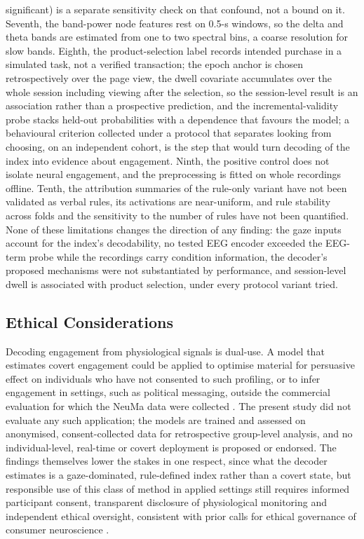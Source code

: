 \documentclass[pdflatex,sn-basic,Numbered,twocolumn,iicol]{sn-jnl}
\theoremstyle{thmstyleone}%
\theoremstyle{thmstyletwo}%
\theoremstyle{thmstylethree}%
\begin{document}
significant) is a separate sensitivity check on that confound, not a bound on it. Seventh, the band-power node features rest on 0.5-s windows, so the delta and theta bands are estimated from one to two spectral bins, a coarse resolution for slow bands. Eighth, the product-selection label records intended purchase in a simulated task, not a verified transaction; the epoch anchor is chosen retrospectively over the page view, the dwell covariate accumulates over the whole session including viewing after the selection, so the session-level result is an association rather than a prospective prediction, and the incremental-validity probe stacks held-out probabilities with a dependence that favours the model; a behavioural criterion collected under a protocol that separates looking from choosing, on an independent cohort, is the step that would turn decoding of the index into evidence about engagement. Ninth, the positive control does not isolate neural engagement, and the preprocessing is fitted on whole recordings offline. Tenth, the attribution summaries of the rule-only variant have not been validated as verbal rules, its activations are near-uniform, and rule stability across folds and the sensitivity to the number of rules have not been quantified. None of these limitations changes the direction of any finding: the gaze inputs account for the index's decodability, no tested EEG encoder exceeded the EEG-term probe while the recordings carry condition information, the decoder's proposed mechanisms were not substantiated by performance, and session-level dwell is associated with product selection, under every protocol variant tried.

\subsection{Ethical Considerations}\label{disc:ethics}

Decoding engagement from physiological signals is dual-use. A model that estimates covert engagement could be applied to optimise material for persuasive effect on individuals who have not consented to such profiling, or to infer engagement in settings, such as political messaging, outside the commercial evaluation for which the NeuMa data were collected \cite{ref35}. The present study did not evaluate any such application; the models are trained and assessed on anonymised, consent-collected data for retrospective group-level analysis, and no individual-level, real-time or covert deployment is proposed or endorsed. The findings themselves lower the stakes in one respect, since what the decoder estimates is a gaze-dominated, rule-defined index rather than a covert state, but responsible use of this class of method in applied settings still requires informed participant consent, transparent disclosure of physiological monitoring and independent ethical oversight, consistent with prior calls for ethical governance of consumer neuroscience \cite{ref33}.
\end{document}
